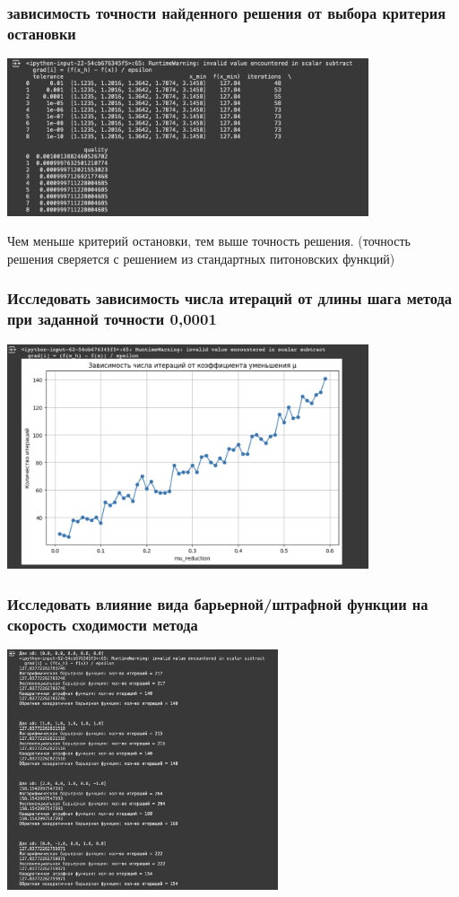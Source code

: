 \documentclass[12pt,pdf,hyperref={unicode}]{beamer}
\begin{document}
\begin{frame}
\frametitle{ зависимость точности найденного решения от выбора критерия остановки}
\begin{center}
    \includegraphics[width=0.8\textwidth]{tolerance.png}
\end{center}

Чем меньше критерий остановки, тем выше точность решения. (точность решения сверяется с решением из стандартных питоновских функций)
\end{frame}

\begin{frame}
\frametitle{Исследовать зависимость числа итераций от длины шага метода при заданной точности 0,0001}
\begin{center}
    \includegraphics[width=0.8\textwidth]{mu.png}
\end{center}

\end{frame}

\begin{frame}
\frametitle{Исследовать влияние вида барьерной/штрафной функции на скорость сходимости метода}
\begin{center}
    \includegraphics[width=0.6\textwidth]{barrier.png}
\end{center}

\end{frame}
\end{document}
